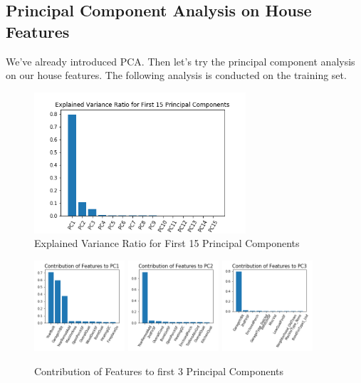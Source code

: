 \documentclass[a4paper]{article}
\begin{document}
\subsection{Principal Component Analysis on House Features}
We've already introduced PCA. Then let's try the principal component analysis on our house features. The following analysis is conducted on the training set.

\begin{figure}[H]
\centering
\includegraphics[width=0.7\textwidth]{pca_explained_ratio.png}
\caption{Explained Variance Ratio for First 15 Principal Components}
\end{figure}

\begin{figure}[H]
\centering
\includegraphics[width=0.3\textwidth]{contribution_to_pc1.png}
\includegraphics[width=0.3\textwidth]{contribution_to_pc2.png}
\includegraphics[width=0.3\textwidth]{contribution_to_pc3.png}
\caption{Contribution of Features to first 3 Principal Components}
\end{figure}
\end{document}
